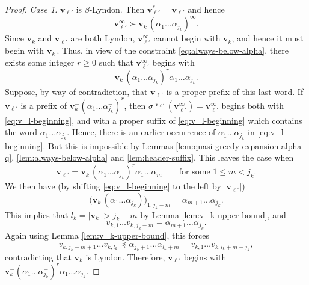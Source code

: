 \documentclass[11pt]{amsart}
\theoremstyle{definition}
\theoremstyle{remark}
\numberwithin{equation}{section}
\renewcommand{\v}{\mathbf{v}}
\newcommand{\f}{\infty}
\newcommand{\al}{\alpha}
\newcommand{\lle}{\preccurlyeq}
\newcommand{\si}{\sigma}
\begin{document}
\begin{proof}
\medskip
{\em Case 1.} $\v_{\ell'}$ is $\beta$-Lyndon. Then $\v_{\ell'}^*=\v_{\ell'}$ and hence
\[
\v_{\ell'}^\f \succ \v_k^-(\al_1\dots\al_{j_k}^-)^\f.
\]
Since $\v_k$ and $\v_{\ell'}$ are both Lyndon, $\v_{\ell'}^\f$ cannot begin with $\v_k$, and hence it must begin with $\v_k^-$. Thus, in view of the constraint \eqref{eq:always-below-alpha}, there exists some integer $r\geq 0$ such that $\v_{\ell'}^\f$ begins with
\begin{equation} \label{eq:v_l-beginning}
\v_k^-(\al_1\dots\al_{j_k}^-)^r\al_1\dots\al_{j_k}.
\end{equation}
Suppose, by way of contradiction, that $\v_{\ell'}$ is a proper prefix of this last word. {If $\v_{\ell'}$ is a prefix of $\v_k^-(\al_1\dots\al_{j_k}^-)^r$, then $\si^{|\v_{\ell'}|}(\v_{\ell'}^\f)=\v_{\ell'}^\f$ begins both with \eqref{eq:v_l-beginning}, and with a proper suffix of \eqref{eq:v_l-beginning} which contains the word $\al_1\dots\al_{j_k}$. Hence, there is an earlier occurrence of $\al_1\dots\al_{j_k}$ in \eqref{eq:v_l-beginning}. But this is impossible by Lemmas \ref{lem:quasi-greedy expansion-alpha-q}, \ref{lem:always-below-alpha} and \ref{lem:header-suffix}. This leaves the case when
\[
\v_{\ell'}=\v_k^-(\al_1\dots\al_{j_k}^-)^r \al_1\dots\al_m \qquad\mbox{for some $1\leq m<j_k$}.
\]
We then have (by shifting \eqref{eq:v_l-beginning} to the left by $|\v_{\ell'}|$)
\[
\big(\v_k^-(\al_1\dots\al_{j_k}^-)\big)_{1:j_k-m}=\al_{m+1}\dots\al_{j_k}.
\]
This implies that $l_k=|\v_k|>j_k-m$ by Lemma \ref{lem:v_k-upper-bound}, and 
\[
v_{k,1}\dots v_{k,j_k-m}=\al_{m+1}\dots\al_{j_k}.
\]
Again using Lemma \ref{lem:v_k-upper-bound}, this forces
\[
v_{k,j_k-m+1}\dots v_{k,l_k}\lle \al_{j_k+1}\dots\al_{l_k+m}=v_{k,1}\dots v_{k,l_k+m-j_k},
\]
}
contradicting that $\v_k$ is Lyndon. Therefore, $\v_{\ell'}$ begins with $\v_k^-(\al_1\dots\al_{j_k}^-)^r\al_1\dots\al_{j_k}$.



\end{proof}
\end{document}
